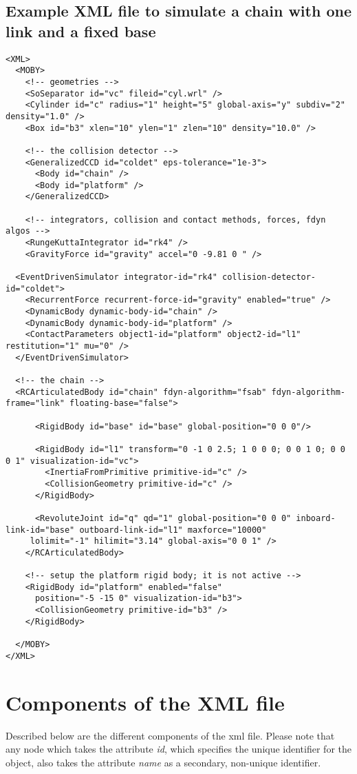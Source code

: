 \documentclass{article}
\begin{document}
\begin{landscape}
\subsection{Example XML file to simulate a chain with one link and a fixed base}
\begin{verbatim}
<XML>
  <MOBY>
    <!-- geometries -->
    <SoSeparator id="vc" fileid="cyl.wrl" />
    <Cylinder id="c" radius="1" height="5" global-axis="y" subdiv="2" density="1.0" />
    <Box id="b3" xlen="10" ylen="1" zlen="10" density="10.0" />

    <!-- the collision detector -->
    <GeneralizedCCD id="coldet" eps-tolerance="1e-3">
      <Body id="chain" />
      <Body id="platform" />
    </GeneralizedCCD>

    <!-- integrators, collision and contact methods, forces, fdyn algos -->
    <RungeKuttaIntegrator id="rk4" />
    <GravityForce id="gravity" accel="0 -9.81 0 " />

  <EventDrivenSimulator integrator-id="rk4" collision-detector-id="coldet">
    <RecurrentForce recurrent-force-id="gravity" enabled="true" /> 
    <DynamicBody dynamic-body-id="chain" />
    <DynamicBody dynamic-body-id="platform" />
    <ContactParameters object1-id="platform" object2-id="l1" restitution="1" mu="0" />
  </EventDrivenSimulator>

  <!-- the chain -->
  <RCArticulatedBody id="chain" fdyn-algorithm="fsab" fdyn-algorithm-frame="link" floating-base="false">

      <RigidBody id="base" id="base" global-position="0 0 0"/>

      <RigidBody id="l1" transform="0 -1 0 2.5; 1 0 0 0; 0 0 1 0; 0 0 0 1" visualization-id="vc">
        <InertiaFromPrimitive primitive-id="c" />
        <CollisionGeometry primitive-id="c" />
      </RigidBody>

      <RevoluteJoint id="q" qd="1" global-position="0 0 0" inboard-link-id="base" outboard-link-id="l1" maxforce="10000"
     lolimit="-1" hilimit="3.14" global-axis="0 0 1" />
    </RCArticulatedBody>

    <!-- setup the platform rigid body; it is not active -->
    <RigidBody id="platform" enabled="false"
      position="-5 -15 0" visualization-id="b3">
      <CollisionGeometry primitive-id="b3" />
    </RigidBody>

  </MOBY>
</XML>
\end{verbatim}


\section{Components of the XML file}
Described below are the different components of the xml file.  Please note that any node which takes the attribute \emph{id}, which specifies the unique identifier for the object, also takes the attribute \emph{name} as a secondary, non-unique identifier.


\end{landscape}
\end{document}
